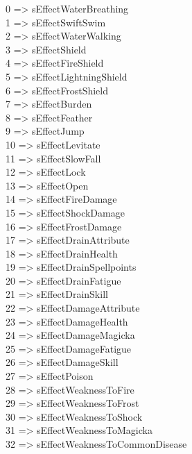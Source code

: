 0 =\textgreater{} sEffectWaterBreathing\\
1 =\textgreater{} sEffectSwiftSwim\\
2 =\textgreater{} sEffectWaterWalking\\
3 =\textgreater{} sEffectShield\\
4 =\textgreater{} sEffectFireShield\\
5 =\textgreater{} sEffectLightningShield\\
6 =\textgreater{} sEffectFrostShield\\
7 =\textgreater{} sEffectBurden\\
8 =\textgreater{} sEffectFeather\\
9 =\textgreater{} sEffectJump\\
10 =\textgreater{} sEffectLevitate\\
11 =\textgreater{} sEffectSlowFall\\
12 =\textgreater{} sEffectLock\\
13 =\textgreater{} sEffectOpen\\
14 =\textgreater{} sEffectFireDamage\\
15 =\textgreater{} sEffectShockDamage\\
16 =\textgreater{} sEffectFrostDamage\\
17 =\textgreater{} sEffectDrainAttribute\\
18 =\textgreater{} sEffectDrainHealth\\
19 =\textgreater{} sEffectDrainSpellpoints\\
20 =\textgreater{} sEffectDrainFatigue\\
21 =\textgreater{} sEffectDrainSkill\\
22 =\textgreater{} sEffectDamageAttribute\\
23 =\textgreater{} sEffectDamageHealth\\
24 =\textgreater{} sEffectDamageMagicka\\
25 =\textgreater{} sEffectDamageFatigue\\
26 =\textgreater{} sEffectDamageSkill\\
27 =\textgreater{} sEffectPoison\\
28 =\textgreater{} sEffectWeaknessToFire\\
29 =\textgreater{} sEffectWeaknessToFrost\\
30 =\textgreater{} sEffectWeaknessToShock\\
31 =\textgreater{} sEffectWeaknessToMagicka\\
32 =\textgreater{} sEffectWeaknessToCommonDisease\\
